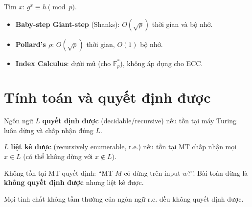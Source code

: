 \documentclass[12pt,a4paper]{article}
\begin{document}
\begin{phuongphap}[title={Logarit rời rạc}]
  Tìm $x$: $g^x \equiv h \pmod{p}$.
  \begin{itemize}
    \item \textbf{Baby-step Giant-step} (Shanks): $O(\sqrt{p})$ thời gian và bộ nhớ.
    \item \textbf{Pollard's $\rho$}: $O(\sqrt{p})$ thời gian, $O(1)$ bộ nhớ.
    \item \textbf{Index Calculus}: dưới mũ (cho $\mathbb{F}_p^*$), không áp dụng cho ECC.
  \end{itemize}
\end{phuongphap}

\section{Tính toán và quyết định được}

\begin{dinhnghia}[title={Quyết định được}]
  Ngôn ngữ $L$ \textbf{quyết định được} (decidable/recursive) nếu tồn tại máy Turing luôn dừng và chấp nhận đúng $L$.
\end{dinhnghia}

\begin{dinhnghia}[title={Liệt kê được}]
  $L$ \textbf{liệt kê được} (recursively enumerable, r.e.) nếu tồn tại MT chấp nhận mọi $x \in L$ (có thể không dừng với $x \notin L$).
\end{dinhnghia}

\begin{dinhly}[title={Bài toán dừng (Halting Problem)}]
  Không tồn tại MT quyết định: ``MT $M$ có dừng trên input $w$?''. Bài toán dừng là \textbf{không quyết định được} nhưng liệt kê được.
\end{dinhly}

\begin{dinhly}[title={Định lý Rice}]
  Mọi tính chất không tầm thường của ngôn ngữ r.e. đều không quyết định được.
\end{dinhly}
\end{document}
